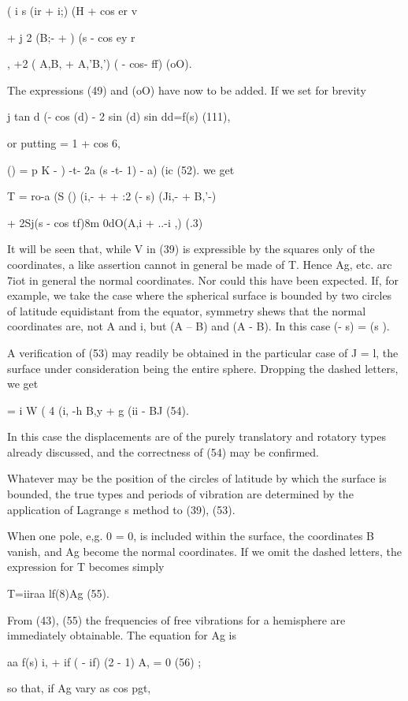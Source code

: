 ( i s (ir + i;) (H + cos er v

+ j 2 (B;- +  ) (s - cos ey r

, +2 ( A,B, + A,'B,') ( - cos- ff) (oO).

The expressions (49) and (oO) have now to be added. If we set for brevity

j tan d (- cos (d) - 2 sin (d) sin dd=f(s) (111),

or putting = 1 + cos 6,

 () = p K - ) -t- 2a (s -t- 1) - a) (ic (52).  we get

T = ro-a (S () (i,- + + :2 (- s) (Ji,- + B,'-)

+ 2Sj(s - cos tf)8m 0dO(A,i + ..-i ,) (.3)

It will be seen that, while V in (39) is expressible by the squares only of the
coordinates, a like assertion cannot in general be made of T. Hence Ag, etc.
arc 7iot in general the normal coordinates. Nor could this have been expected.
If, for example, we take the case where the spherical surface is bounded by
two circles of latitude equidistant from the equator, symmetry shews that the
normal coordinates are, not A and i, but (A -- B) and (A - B). In this case (-
s) = (s ).

A verification of (53) may readily be obtained in the particular case of J = l,
the surface under consideration being the entire sphere. Dropping the dashed
letters, we get

= i W ( 4 (i, -h B,y + g (ii - BJ (54).

In this case the displacements are of the purely translatory and rotatory
types already discussed, and the correctness of (54) may be confirmed.

Whatever may be the position of the circles of latitude by which the surface is
bounded, the true types and periods of vibration are determined by the
application of Lagrange s method to (39), (53).

When one pole, e,g. 0 = 0, is included within the surface, the coordinates B
vanish, and Ag become the normal coordinates.  If we omit the dashed
letters, the expression for T becomes simply

T=iiraa lf(8)Ag (55).

From (43), (55) the frequencies of free vibrations for a hemisphere are
immediately obtainable. The equation for Ag is

aa f(s) i, + if ( - if) (2 - 1) A, = 0 (56) ;

so that, if Ag vary as cos pgt,


